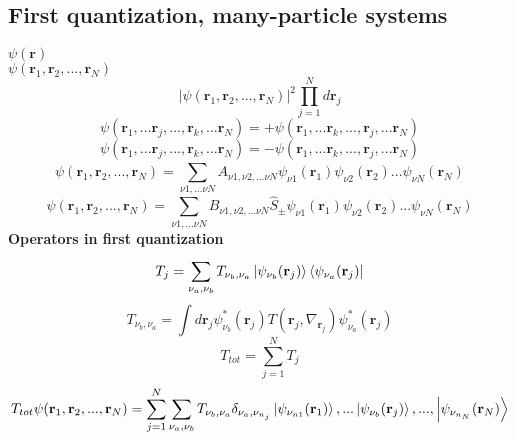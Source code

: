 \documentclass{article}
\begin{document}
\subsection{First quantization, many-particle systems}
$\psi (\textbf{r}) $\\
$\psi (\textbf{r}_1,\textbf{r}_2,...,\textbf{r}_N) $ \\
\begin{equation*}
    |\psi(\textbf{r}_1,\textbf{r}_2,...,\textbf{r}_N)|^2 \prod_{j=1}^{N}d\textbf{r}_j
\end{equation*}
\begin{equation*}
    \psi(\textbf{r}_1, ... \textbf{r}_j, ..., \textbf{r}_k, ... \textbf{r}_N)= + \psi(\textbf{r}_1, ... \textbf{r}_k, ..., \textbf{r}_j, ... \textbf{r}_N)
\end{equation*}
\begin{equation*}
    \psi(\textbf{r}_1, ... \textbf{r}_j, ..., \textbf{r}_k, ... \textbf{r}_N)= - \psi(\textbf{r}_1, ... \textbf{r}_k, ..., \textbf{r}_j, ... \textbf{r}_N)
\end{equation*}
\begin{equation*}
    \psi(\textbf{r}_1,\textbf{r}_2,...,\textbf{r}_N)=\sum_{\nu1,...\nu N}^{} A_{\nu 1 , \nu 2 , ... \nu N }\psi_{\nu 1}(\textbf{r}_1)\psi_{\nu 2}(\textbf{r}_2) ... \psi_{\nu N}(\textbf{r}_N)
\end{equation*}
\begin{equation*}
    \psi(\textbf{r}_1,\textbf{r}_2,...,\textbf{r}_N)=\sum_{\nu1,...\nu N}^{} B_{\nu 1 , \nu 2 , ... \nu N } \hat{S}_{\pm} \psi_{\nu 1}(\textbf{r}_1)\psi_{\nu 2}(\textbf{r}_2) ... \psi_{\nu N}(\textbf{r}_N)
\end{equation*}
\textbf{Operators in first quantization}
\begin{equation*}
    T_j=\sum_{\nu_a,\nu_b}^{} T_{\nu_b,\nu_a} \ket{\psi_{\nu_b}(\textbf{r}_j)}\bra{\psi_{\nu_a}(\textbf{r}_j)}
\end{equation*}
\begin{equation*}
    T_{\nu_b,\nu_a}=\int d \textbf{r}_j \psi^*_{\nu_b}(\textbf{r}_j) T(\textbf{r}_j,\nabla_{\textbf{r}_j}) \psi^*_{\nu_a}(\textbf{r}_j)
\end{equation*}
\begin{equation*}
    T_{tot}=\sum_{j=1}^{N} T_j
\end{equation*}
\begin{equation*}
    T_{tot}\psi(\textbf{r}_1,\textbf{r}_2,...,\textbf{r}_N)=\sum_{j=1}^{N}\sum_{\nu_a,\nu_b}T_{\nu_b,\nu_a}\delta_{\nu_a,\nu_{n_j}}\ket{\psi_{\nu_{n1}}(\textbf{r}_1)},...\ket{\psi_{\nu_{b}}(\textbf{r}_j)},...,\ket{\psi_{\nu_{n_N}}(\textbf{r}_N)}
\end{equation*}
\end{document}
